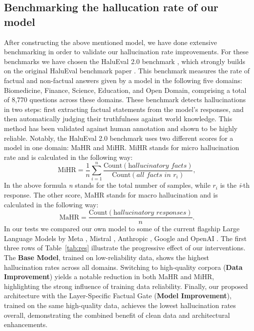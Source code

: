 \subsection{Benchmarking the hallucation rate of our model}


After constructing the above mentioned model, we have done extensive benchmarking in order to validate our hallucination rate improvements. For these benchmarks we have chosen the HaluEval 2.0 benchmark \cite{li2024dawn}, which strongly builds on the original HaluEval benchmark paper \cite{li2023halueval}. This benchmark measures the rate of factual and non-factual answers given by a model in the following five domains: Biomedicine, Finance, Science, Education, and Open Domain, comprising a total of 8,770 questions across these domains. These benchmark detects hallucinations in two steps: first extracting factual statements from the model’s responses, and then automatically judging their truthfulness against world knowledge. This method has been validated against human annotation and shown to be highly reliable. Notably, the HaluEval 2.0 benchmark uses two different scores for a model in one domain: MaHR and MiHR. MiHR stands for micro hallucination rate and is calculated in the following way: 
\[
\text{MiHR} = \frac{1}{n} \sum_{i=1}^{n} 
\frac{\text{Count}(\textit{hallucinatory facts})}
{\text{Count}(\textit{all facts in } r_i)},
\]
In the above formula \textit{n} stands for the total number of samples, while $r_i$ is the \textit{i}-th response. The other score, MaHR stands for macro hallucination and is calculated in the following way:
\[
\text{MaHR} = \frac{\text{Count}(\textit{hallucinatory responses})}{n}.
\]
In our tests we compared our own model to some of the current flagship Large Language Models by Meta \cite{Llama}, Mistral \cite{Mistral}, Anthropic \cite{Anthropic}, Google \cite{Gemini} and OpenAI \cite{OpenAI}.
The first three rows of Table~\ref{tab:res} illustrate the progressive effect of our interventions. The \textbf{Base Model}, trained on low-reliability data, shows the highest hallucination rates across all domains. Switching to high-quality corpora (\textbf{Data Improvement}) yields a notable reduction in both MaHR and MiHR, highlighting the strong influence of training data reliability. Finally, our proposed architecture with the Layer-Specific Factual Gate (\textbf{Model Improvement}), trained on the same high-quality data, achieves the lowest hallucination rates overall, demonstrating the combined benefit of clean data and architectural enhancements.



